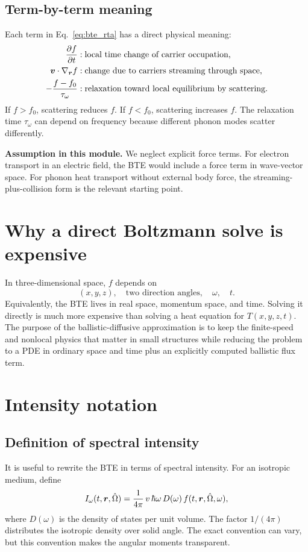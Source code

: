 \documentclass[11pt]{article}
\begin{document}
\subsection{Term-by-term meaning}
Each term in Eq.~\eqref{eq:bte_rta} has a direct physical meaning:
\begin{align}
    \frac{\partial f}{\partial t} &: \text{local time change of carrier occupation,}\\
    \bm{v}\cdot\nabla_{\bm{r}}f &: \text{change due to carriers streaming through space,}\\
    -\frac{f-f_0}{\tau_\omega} &: \text{relaxation toward local equilibrium by scattering.}
\end{align}
If \(f>f_0\), scattering reduces \(f\). If \(f<f_0\), scattering increases \(f\). The relaxation time \(\tau_\omega\) can depend on frequency because different phonon modes scatter differently.

\begin{notebox}
\textbf{Assumption in this module.} We neglect explicit force terms. For electron transport in an electric field, the BTE would include a force term in wave-vector space. For phonon heat transport without external body force, the streaming-plus-collision form is the relevant starting point.
\end{notebox}

\section{Why a direct Boltzmann solve is expensive}
In three-dimensional space, \(f\) depends on
\begin{equation}
    (x,y,z),\quad \text{two direction angles},\quad \omega,\quad t.
\end{equation}
Equivalently, the BTE lives in real space, momentum space, and time. Solving it directly is much more expensive than solving a heat equation for \(T(x,y,z,t)\). The purpose of the ballistic-diffusive approximation is to keep the finite-speed and nonlocal physics that matter in small structures while reducing the problem to a PDE in ordinary space and time plus an explicitly computed ballistic flux term.

\section{Intensity notation}
\subsection{Definition of spectral intensity}
It is useful to rewrite the BTE in terms of spectral intensity. For an isotropic medium, define
\begin{equation}
    I_\omega(t,\bm{r},\hat{\Omega})
    =\frac{1}{4\pi}\,v\,\hbar\omega\,D(\omega)\,f(t,\bm{r},\hat{\Omega},\omega),
    \label{eq:intensity_definition}
\end{equation}
where \(D(\omega)\) is the density of states per unit volume. The factor \(1/(4\pi)\) distributes the isotropic density over solid angle. The exact convention can vary, but this convention makes the angular moments transparent.
\end{document}
